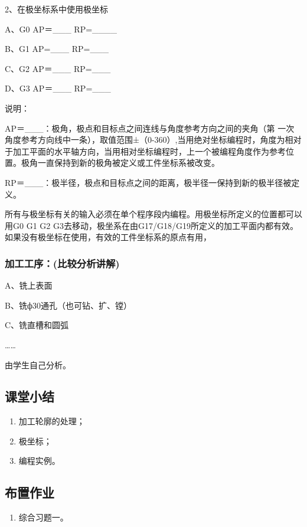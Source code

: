 2、在极坐标系中使用极坐标

A、G0 AP＝\_\_\_ RP=\_\_\_\_

B、G1 AP=\_\_\_ RP=\_\_\_

C、G2 AP＝\_\_\_ RP=\_\_\_

D、G3 AP＝\_\_\_ RP=\_\_\_

说明：

AP＝\_\_\_：极角，极点和目标点之间连线与角度参考方向之间的夹角（第
一次角度参考方向线中一条），取值范围±（0-360）,当用绝对坐标编程时，角度为相对于加工平面的水平轴方向，当用相对坐标编程时，上一个被编程角度作为参考位置。极角一直保持到新的极角被定义或工件坐标系被改变。

RP＝\_\_\_：极半径，极点和目标点之间的距离，极半径一保持到新的极半径被定义。

所有与极坐标有关的输入必须在单个程序段内编程。用极坐标所定义的位置都可以用G0 G1 G2 G3去移动，极坐系在由G17/G18/G19所定义的加工平面内都有效。如果没有极坐标在使用，有效的工件坐标系的原点有用，

\subsubsection{加工工序：(比较分析讲解)}

A、铣上表面

B、铣ф30通孔（也可钻、扩、镗）

C、铣直槽和圆弧

……

由学生自己分析。

\subsection{课堂小结}
\begin{enumerate}[1、]
\item 加工轮廓的处理；
\item 极坐标；
\item 编程实例。
\end{enumerate}

\vfill
\subsection{布置作业}
\begin{enumerate}[1、]
	\item 综合习题一。
\end{enumerate}
\vfill